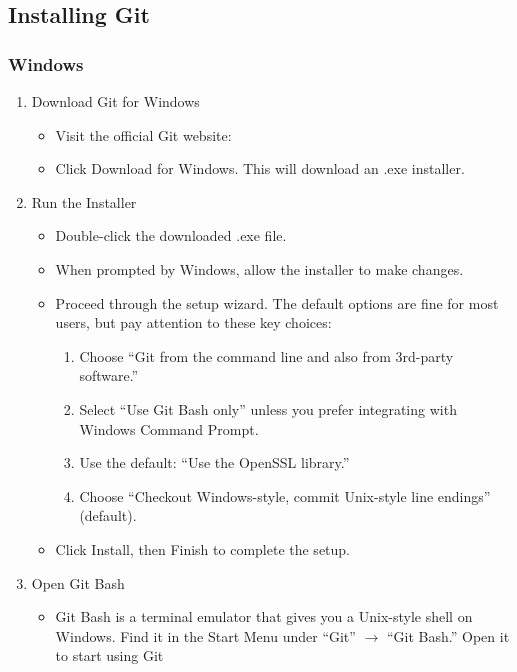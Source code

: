 \subsection*{Installing Git}
\subsubsection{Windows}
\begin{enumerate}
\item Download Git for Windows
	\begin{itemize}
		\item Visit the official Git website: 
		\item Click Download for Windows. This will download an .exe installer.
	\end{itemize}
\item Run the Installer
	\begin{itemize}
		\item Double-click the downloaded .exe file.
		\item When prompted by Windows, allow the installer to make changes.
		\item Proceed through the setup wizard. The default options are fine for most users, but pay attention to these key choices:
		\begin{enumerate}
			\item Choose ``Git from the command line and also from 3rd-party software.''
			\item Select ``Use Git Bash only” unless you prefer integrating with Windows Command Prompt.
			\item Use the default: “Use the OpenSSL library.''
			\item Choose ``Checkout Windows-style, commit Unix-style line endings'' (default).
		\end{enumerate}
		\item Click Install, then Finish to complete the setup.
	\end{itemize}
\item Open Git Bash
	\begin{itemize}
	\item Git Bash is a terminal emulator that gives you a Unix-style shell on Windows. Find it in the Start Menu under ``Git'' $\rightarrow$ ``Git Bash.'' Open it to start using Git
	\end{itemize}
\end{enumerate}

